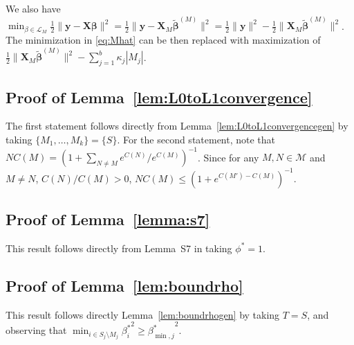 \documentclass[aos]{imsart}
\theoremstyle{plain}
\newcommand{\M}{\mathcal{M}}
\newcommand{\bs}{\boldsymbol}
\begin{document}
 We also have $\min_{\beta\in \mathcal{L}_M} \tfrac{1}{2}\|\bs y-\bs X\bs\beta\|^2=\tfrac{1}{2}\|\bs y-\bs X_{\!\!M}\tilde{\bs \beta}^{(M)}\|^2=\tfrac{1}{2}\|\bs y\|^2-\tfrac{1}{2}\|\bs X_{\!\!M}\tilde{\bs\beta}^{(M)}\|^2$. The minimization in \eqref{eq:Mhat} can be then replaced with maximization of $\tfrac{1}{2}
 \|\bs X_{\!\!M}\tilde{\bs\beta}^{(M)}\|^2-\sum_{j=1}^b \kappa_j|M_j|$.

\subsection{Proof of Lemma~\ref{lem:L0toL1convergence}}
The first statement follows directly from Lemma~\ref{lem:L0toL1convergencegen} by taking $\{M_1,\ldots,M_k\}=\{S\}$. For the second statement, note that  $NC(M)=(1+\sum_{N \neq M} e^{C(N)}/ e^{C(M)})^{-1}$. Since for any $M,N\in \M$ and $M\neq N$, $C(N) / C(M)>0$, $NC(M) \leq (1+e^{C(M')-C(M)})^{-1}$.

\subsection{Proof of Lemma~\ref{lemma:s7}}
    This result follows directly from Lemma~S7 in \cite{rossell2022concentration} taking $\phi^*=1$.

\subsection{Proof of Lemma~\ref{lem:boundrho}}
This result follows directly Lemma~\ref{lem:boundrhogen} by taking $T=S$, and observing that $\min_{i\in S_j\setminus M_j}{\beta^*_i}^2\geq {\beta^*_{\min,j}}^2$.
\end{document}
